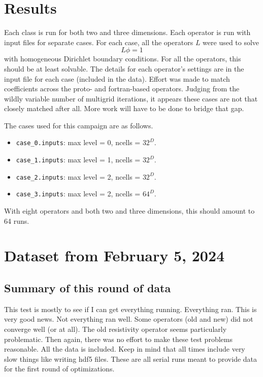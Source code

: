 \documentclass{article}
\begin{document}
 \section{Results}
 
 Each class is run for both two and three dimensions.   Each operator
 is run with input files for  separate cases.    
 For each case, all the operators $L$ were used to solve
$$
L\phi = 1
$$
with homogeneous Dirichlet boundary conditions.  For all the
operators, this should be at least solvable.    The details for each
operator's settings are in the input file for each case (included in
the data).    Effort was made to match coefficients across the proto-
and fortran-based operators.   Judging from the wildly variable number
of multigrid iterations, it appears these cases are not that closely
matched after all.   More work will have to be done to bridge that gap.

The cases used for this campaign are as follows.
 \begin{itemize}
   \item {\tt case\_0.inputs}: max level = 0, ncells = $32^D$.
   \item {\tt case\_1.inputs}: max level = 1, ncells = $32^D$.
   \item {\tt case\_2.inputs}: max level = 2, ncells = $32^D$.
   \item {\tt case\_3.inputs}: max level = 2, ncells = $64^D$.
 \end{itemize}
 With eight operators and both two and three dimensions,
 this should amount to 64 runs.   
\section{Dataset from February 5, 2024}
 
\subsection{Summary of this round of data}

This test is mostly to see if I can get everything running.
Everything ran.   This is very good news.   Not everything ran well.
Some operators (old and new) did not converge well (or at all).   The old
resistivity operator seems particularly problematic.   Then
again, there was no effort to make these test problems reasonable.
All the data is included.   Keep in mind that all times include very
slow things like writing hdf5 files.   These are all serial runs meant
to provide data for the first round of optimizations.   
\end{document}
